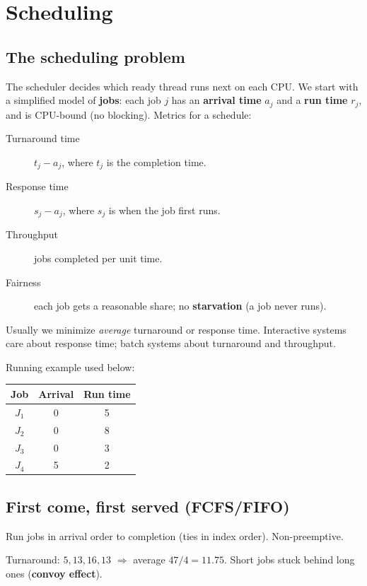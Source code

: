 \chapter{Scheduling}

\section{The scheduling problem}

The scheduler decides which ready thread runs next on each CPU. We start with a simplified
model of \textbf{jobs}: each job $j$ has an \textbf{arrival time} $a_j$ and a \textbf{run time}
$r_j$, and is CPU-bound (no blocking). Metrics for a schedule:

\begin{description}
  \item[Turnaround time] $t_j - a_j$, where $t_j$ is the completion time.
  \item[Response time] $s_j - a_j$, where $s_j$ is when the job first runs.
  \item[Throughput] jobs completed per unit time.
  \item[Fairness] each job gets a reasonable share; no \textbf{starvation} (a job never runs).
\end{description}
Usually we minimize \emph{average} turnaround or response time. Interactive systems care about
response time; batch systems about turnaround and throughput.

Running example used below:
\begin{center}
\begin{tabular}{@{}ccc@{}}
\toprule
Job & Arrival & Run time \\
\midrule
$J_1$ & 0 & 5 \\
$J_2$ & 0 & 8 \\
$J_3$ & 0 & 3 \\
$J_4$ & 5 & 2 \\
\bottomrule
\end{tabular}
\end{center}

\section{First come, first served (FCFS/FIFO)}

Run jobs in arrival order to completion (ties in index order). Non-preemptive.

\begin{center}
\end{center}
Turnaround: $5, 13, 16, 13$ $\Rightarrow$ average $47/4 = 11.75$. Short jobs stuck behind long ones
(\textbf{convoy effect}).

